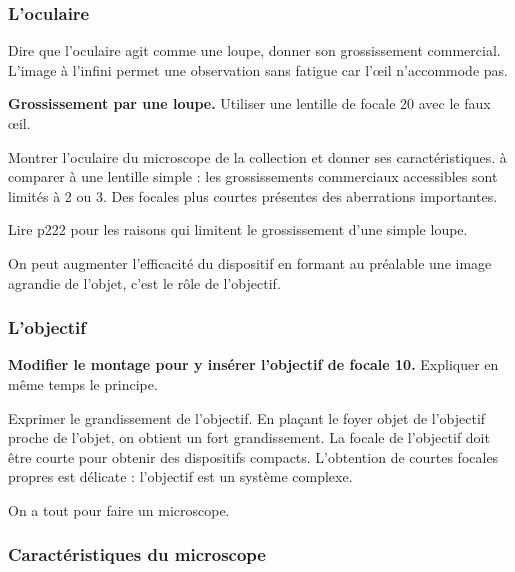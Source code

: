 \subsubsection{L'oculaire}

Dire que l'oculaire agit comme une loupe, donner son grossissement commercial.
L'image à l'infini permet une observation sans fatigue car l'œil n'accommode pas.

\begin{experience}
\textbf{Grossissement par une loupe.}
Utiliser une lentille de focale \unit{20}{\centi\meter} avec le faux œil.
\end{experience}

Montrer l'oculaire du microscope de la collection et donner ses caractéristiques.
à comparer à une lentille simple : les grossissements commerciaux accessibles sont limités à 2 ou 3.
Des focales plus courtes présentes des aberrations importantes.

\begin{remarque}
Lire \cite{Hecht2002} p222 pour les raisons qui limitent le grossissement d'une simple loupe.
\end{remarque}

\begin{transition}
On peut augmenter l'efficacité du dispositif en formant au préalable une image agrandie de l'objet, c'est le rôle de l'objectif.
\end{transition}

\subsubsection{L'objectif}

\begin{experience}
\textbf{Modifier le montage pour y insérer l'objectif de focale \unit{10}{\centi\meter}.}
Expliquer en même temps le principe.
\end{experience}

Exprimer le grandissement de l'objectif.
En plaçant le foyer objet de l'objectif proche de l'objet, on obtient un fort grandissement.
La focale de l'objectif doit être courte pour obtenir des dispositifs compacts.
L'obtention de courtes focales propres est délicate : l'objectif est un système complexe.

\begin{transition}
On a tout pour faire un microscope.
\end{transition}

\subsubsection{Caractéristiques du microscope}

